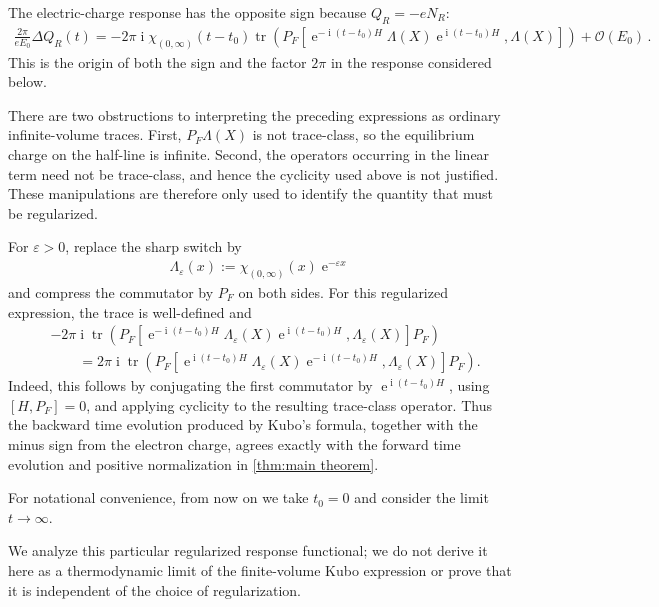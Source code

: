 \documentclass[a4paper,10pt]{article}
\numberwithin{equation}{section}
\theoremstyle{plain}
\theoremstyle{plain}
\theoremstyle{plain}
\theoremstyle{plain}
\theoremstyle{plain}
\theoremstyle{remark}
\theoremstyle{definition}
\theoremstyle{plain}
\newcommand{\ee}{\operatorname{e}}
\newcommand{\ii}{\operatorname{i}}
\newcommand{\calO}{\mathcal{O}}
\newcommand{\tr}{\operatorname{tr}}
\newcommand{\ve}{\varepsilon}
\newcommand{\eq}[1]{\begin{align*}#1\end{align*}}
\begin{document}
The electric-charge response has the opposite sign because $Q_R=-eN_R$:
\eq{\frac{2\pi}{eE_0}\Delta Q_R(t)
=
-2\pi\ii\chi_{(0,\infty)}(t-t_0)
\tr\left(
P_F\left[
\ee^{-\ii(t-t_0)H}\Lambda(X)\ee^{\ii(t-t_0)H},
\Lambda(X)
\right]
\right)
+\calO(E_0)\,.}
This is the origin of both the sign and the factor $2\pi$ in the response
considered below.

There are two obstructions to interpreting the preceding expressions as
ordinary infinite-volume traces. First, $P_F\Lambda(X)$ is not trace-class,
so the equilibrium charge on the half-line is infinite. Second, the
operators occurring in the linear term need not be trace-class, and hence
the cyclicity used above is not justified. These manipulations are therefore
only used to identify the quantity that must be regularized.

For $\ve>0$, replace the sharp switch by
\eq{\Lambda_\ve(x):=\chi_{(0,\infty)}(x)\ee^{-\ve x}}
and compress the commutator by $P_F$ on both sides. For this regularized
expression, the trace is well-defined and
\eq{&-2\pi\ii\tr\left(
P_F\left[
\ee^{-\ii(t-t_0)H}\Lambda_\ve(X)\ee^{\ii(t-t_0)H},
\Lambda_\ve(X)
\right]P_F
\right)\\
&\qquad=
2\pi\ii\tr\left(
P_F\left[
\ee^{\ii(t-t_0)H}\Lambda_\ve(X)\ee^{-\ii(t-t_0)H},
\Lambda_\ve(X)
\right]P_F
\right).}
Indeed, this follows by conjugating the first commutator by
$\ee^{\ii(t-t_0)H}$, using $[H,P_F]=0$, and applying cyclicity to the
resulting trace-class operator. Thus the backward time evolution produced
by Kubo's formula, together with the minus sign from the electron charge,
agrees exactly with the forward time evolution and positive normalization
in \cref{thm:main theorem}.

For notational convenience, from now on we take $t_0=0$ and consider the
limit $t\to\infty$.

We analyze this particular regularized response functional; we do not derive
it here as a thermodynamic limit of the finite-volume Kubo expression or
prove that it is independent of the choice of regularization.
\end{document}
